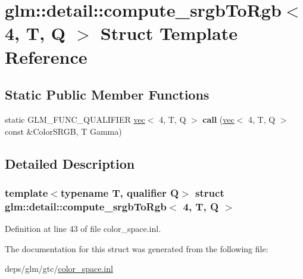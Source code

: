 \hypertarget{structglm_1_1detail_1_1compute__srgbToRgb_3_014_00_01T_00_01Q_01_4}{}\section{glm\+:\+:detail\+:\+:compute\+\_\+srgb\+To\+Rgb$<$ 4, T, Q $>$ Struct Template Reference}
\label{structglm_1_1detail_1_1compute__srgbToRgb_3_014_00_01T_00_01Q_01_4}
\subsection*{Static Public Member Functions}
\begin{DoxyCompactItemize}
\item 
\mbox{\label{structglm_1_1detail_1_1compute__srgbToRgb_3_014_00_01T_00_01Q_01_4_abda95674c23692a1c21f2d141ca2e024}} 
static G\+L\+M\+\_\+\+F\+U\+N\+C\+\_\+\+Q\+U\+A\+L\+I\+F\+I\+ER \hyperlink{structglm_1_1vec}{vec}$<$ 4, T, Q $>$ {\bfseries call} (\hyperlink{structglm_1_1vec}{vec}$<$ 4, T, Q $>$ const \&Color\+S\+R\+GB, T Gamma)
\end{DoxyCompactItemize}


\subsection{Detailed Description}
\subsubsection*{template$<$typename T, qualifier Q$>$\newline
struct glm\+::detail\+::compute\+\_\+srgb\+To\+Rgb$<$ 4, T, Q $>$}



Definition at line 43 of file color\+\_\+space.\+inl.



The documentation for this struct was generated from the following file\+:\begin{DoxyCompactItemize}
\item 
deps/glm/gtc/\hyperlink{gtc_2color__space_8inl}{color\+\_\+space.\+inl}\end{DoxyCompactItemize}
